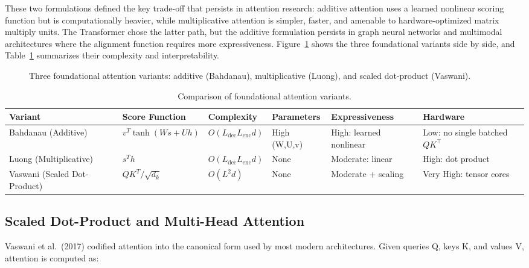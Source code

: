 \documentclass[10pt,twocolumn]{article}
\begin{document}
These two formulations defined the key trade-off that persists in attention research: additive attention uses a learned nonlinear scoring function but is computationally heavier, while multiplicative attention is simpler, faster, and amenable to hardware-optimized matrix multiply units. The Transformer chose the latter path, but the additive formulation persists in graph neural networks and multimodal architectures where the alignment function requires more expressiveness. Figure~\ref{fig:variants} shows the three foundational variants side by side, and Table~\ref{tab:variants} summarizes their complexity and interpretability.

\begin{figure}[!tbp]
\centering
\resizebox{\textwidth}{!}{}
\caption{Three foundational attention variants: additive (Bahdanau), multiplicative (Luong), and scaled dot-product (Vaswani).}\label{fig:variants}
\end{figure}

\begin{table}[!tbp]
\centering
\footnotesize
\caption{Comparison of foundational attention variants.}
\label{tab:variants}
\begin{tabular}{p{2.2cm}p{2.4cm}p{1.8cm}p{1.3cm}p{2.8cm}p{1.8cm}}
\toprule
Variant & Score Function & Complexity & Parameters & Expressiveness & Hardware \\
\midrule
Bahdanau (Additive) & $v^T \tanh(W s + U h)$ & $O(L_{\mathrm{dec}}L_{\mathrm{enc}}d)$ & High (W,U,v) & High: learned nonlinear & Low: no single batched $QK^\top$ \\
Luong (Multiplicative) & $s^T h$ & $O(L_{\mathrm{dec}}L_{\mathrm{enc}}d)$ & None & Moderate: linear & High: dot product \\
Vaswani (Scaled Dot-Product) & $QK^T / \sqrt{d_k}$ & $O(L^2 d)$ & None & Moderate + scaling & Very High: tensor cores \\
\bottomrule
\end{tabular}
\end{table}

\subsection{Scaled Dot-Product and Multi-Head Attention}\label{scaled-dot-product-and-multi-head-attention}

Vaswani et al.~(2017) codified attention into the canonical form used by most modern architectures. Given queries Q, keys K, and values V, attention is computed as:
\end{document}
